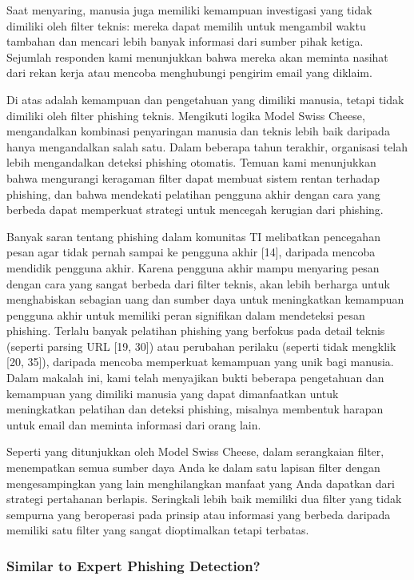 \documentclass[lettersize,journal]{IEEEtran}
\begin{document}
Saat menyaring, manusia juga memiliki kemampuan investigasi yang tidak dimiliki
oleh filter teknis: mereka dapat memilih untuk mengambil waktu tambahan dan
mencari lebih banyak informasi dari sumber pihak ketiga. Sejumlah responden
kami menunjukkan bahwa mereka akan meminta nasihat dari rekan kerja atau
mencoba menghubungi pengirim email yang diklaim.

Di atas adalah kemampuan dan pengetahuan yang dimiliki manusia, tetapi tidak
dimiliki oleh filter phishing teknis. Mengikuti logika Model Swiss Cheese,
mengandalkan kombinasi penyaringan manusia dan teknis lebih baik daripada hanya
mengandalkan salah satu. Dalam beberapa tahun terakhir, organisasi telah lebih
mengandalkan deteksi phishing otomatis. Temuan kami menunjukkan bahwa
mengurangi keragaman filter dapat membuat sistem rentan terhadap phishing, dan
bahwa mendekati pelatihan pengguna akhir dengan cara yang berbeda dapat
memperkuat strategi untuk mencegah kerugian dari phishing.

Banyak saran tentang phishing dalam komunitas TI melibatkan pencegahan pesan
agar tidak pernah sampai ke pengguna akhir [14], daripada mencoba mendidik
pengguna akhir. Karena pengguna akhir mampu menyaring pesan dengan cara yang
sangat berbeda dari filter teknis, akan lebih berharga untuk menghabiskan
sebagian uang dan sumber daya untuk meningkatkan kemampuan pengguna akhir untuk
memiliki peran signifikan dalam mendeteksi pesan phishing. Terlalu banyak
pelatihan phishing yang berfokus pada detail teknis (seperti parsing URL [19,
    30]) atau perubahan perilaku (seperti tidak mengklik [20, 35]), daripada
mencoba memperkuat kemampuan yang unik bagi manusia. Dalam makalah ini, kami
telah menyajikan bukti beberapa pengetahuan dan kemampuan yang dimiliki manusia
yang dapat dimanfaatkan untuk meningkatkan pelatihan dan deteksi phishing,
misalnya membentuk harapan untuk email dan meminta informasi dari orang lain.

Seperti yang ditunjukkan oleh Model Swiss Cheese, dalam serangkaian filter,
menempatkan semua sumber daya Anda ke dalam satu lapisan filter dengan
mengesampingkan yang lain menghilangkan manfaat yang Anda dapatkan dari
strategi pertahanan berlapis. Seringkali lebih baik memiliki dua filter yang
tidak sempurna yang beroperasi pada prinsip atau informasi yang berbeda
daripada memiliki satu filter yang sangat dioptimalkan tetapi terbatas.

\subsubsection{Similar to Expert Phishing Detection?}
\end{document}
